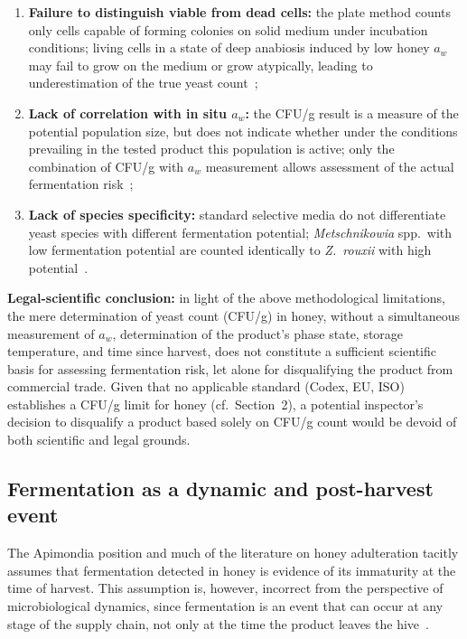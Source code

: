 \begin{enumerate}
    \item \textbf{Failure to distinguish viable from dead cells:}
          the plate method counts only cells capable of forming
          colonies on solid medium under incubation conditions;
          living cells in a state of deep anabiosis induced by
          low honey $a_w$ may fail to grow on the medium or grow
          atypically, leading to underestimation of the true yeast
          count~\cite{intechopen_microb2017};
    \item \textbf{Lack of correlation with in situ $a_w$:} the
          CFU/g result is a measure of the potential population size,
          but does not indicate whether under the conditions prevailing
          in the tested product this population is active;
          only the combination of CFU/g with $a_w$ measurement allows
          assessment of the actual fermentation
          risk~\cite{ruegg1981};
    \item \textbf{Lack of species specificity:} standard selective
          media do not differentiate yeast species with different
          fermentation potential; \textit{Metschnikowia}
          spp.\ with low fermentation potential are counted
          identically to \textit{Z.~rouxii} with high
          potential~\cite{rodriguezmachado2024}.
\end{enumerate}

\textbf{Legal-scientific conclusion:} in light of the above
methodological limitations, the mere determination of yeast count
(CFU/g) in honey, without a simultaneous measurement of $a_w$,
determination of the product's phase state, storage temperature,
and time since harvest, does not constitute a sufficient scientific
basis for assessing fermentation risk, let alone for disqualifying
the product from commercial trade. Given that no applicable standard
(Codex, EU, ISO) establishes a CFU/g limit for honey
(cf.~Section~2), a potential inspector's decision to disqualify
a product based solely on CFU/g count would be devoid of both
scientific and legal grounds.

\subsection{Fermentation as a dynamic and post-harvest event}

The Apimondia position and much of the literature on honey
adulteration tacitly assumes that fermentation detected in honey
is evidence of its immaturity at the time of harvest.
This assumption is, however, incorrect from the perspective of
microbiological dynamics, since fermentation is an event that can
occur at any stage of the supply chain, not only at the time
the product leaves the hive~\cite{apinz2021,analytica2020}.

